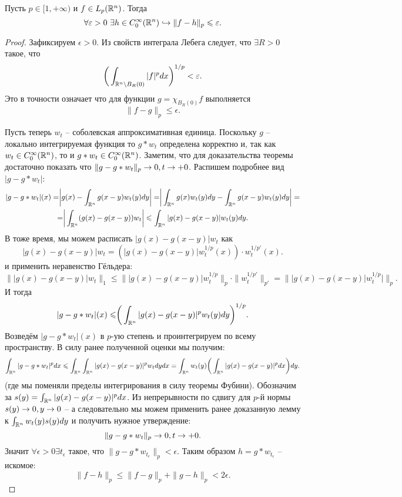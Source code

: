 \begin{theorem}
    Пусть $p \in [1, +\infty)$ и $f \in L_p(\mathbb{R}^n)$. Тогда
    \[
        \forall \varepsilon > 0  \ \exists h \in C^{\infty}_0(\mathbb{R}^n) \hookrightarrow \|f - h\|_p \leqslant \varepsilon.
    \]
\end{theorem}
\begin{proof}
    Зафиксируем $\epsilon > 0$.
    Из свойств интеграла Лебега следует, что $\exists R > 0$ такое, что
    \[
        \biggr(\int_{\mathbb{R}^n \setminus B_R(0)} |f|^p dx\biggr)^{1/p} < \varepsilon.
    \]
    Это в точности означает что для функции $g = \chi_{B_R(0)}f$ выполняется
    \[
        \|f - g\|_p \leq \epsilon.
    \]
    
    Пусть теперь $w_t$ -- соболевская аппроксимативная единица.
    Поскольку $g$ -- локально интегрируемая функция то $g * w_t$ определена корректно и, так как $w_t \in C_0^\infty(\mathbb{R}^n)$, то и $g * w_t \in C_0^\infty(\mathbb{R}^n)$.
    Заметим, что для доказательства теоремы достаточно показать что $\|g - g * w_t\|_p \rightarrow 0, t \rightarrow +0$.
    Распишем подробнее вид $|g - g * w_t|$:
    \begin{multline*}
        |g - g * w_t|(x) = \biggr| g(x) - \int_{\mathbb{R}^n} g(x - y)w_t(y)dy \biggr| = \biggr|\int_{\mathbb{R}^n} g(x)w_t(y)dy - \int_{\mathbb{R}^n} g(x - y)w_t(y)dy\biggr| = \\ = \biggr|\int_{\mathbb{R}^n} (g(x) - g(x - y))w_t\biggr| \leqslant \int_{\mathbb{R}^n} |g(x) - g(x - y)|w_t(y)dy.
    \end{multline*}
    В тоже время, мы можем расписать $|g(x) - g(x - y)|w_t$ как \[|g(x) - g(x - y)|w_t = (|g(x) - g(x - y)|w_t^{1/p}(x)) \cdot w_t^{1/p'}(x).\]
    и применить неравенство Гёльдера:
    \[
        \||g(x) - g(x - y)|w_t\|_1 \leq \||g(x) - g(x - y)|w_t^{1/p}\|_p \cdot \|w_t^{1/p'}\|_{p'} = \||g(x) - g(x - y)|w_t^{1/p}|\|_p.
    \]
    И тогда
    \[
        |g - g * w_t|(x) \leqslant \biggr( \int_{\mathbb{R}^n}|g(x) - g(x - y)|^p w_t(y)dy \biggr)^{1/p}.
    \]
    Возведём $|g - g * w_t|(x)$ в $p$-ую степень и проинтегрируем по всему пространству.
    В силу ранее полученной оценки мы получим:
    \[
        \int_{\mathbb{R}^n}|g - g * w_t|^p dx \leqslant \int_{\mathbb{R}^n} \int_{\mathbb{R}^n} |g(x) - g(x - y)|^p w_t dy dx = \int_{\mathbb{R}^n} w_t(y) \biggr(\int_{\mathbb{R}^n} |g(x) - g(x - y)|^{p} dx \biggr) dy.
    \]
    (где мы поменяли пределы интегрирования в силу теоремы Фубини).
    Обозначим за $s(y) = \int_{\mathbb{R}^n}|g(x) - g(x - y)|^p dx$.
    Из непрерывности по сдвигу для $p$-й нормы $s(y) \rightarrow 0, y \rightarrow 0$ -- а следовательно мы можем применить ранее доказанную лемму к $\int_{\mathbb{R}^n}w_t(y)s(y)dy$ и получить нужное утверждение:
    \[
        \|g - g * w_t\|_p \rightarrow 0, t \rightarrow +0.
    \]
    Значит $\forall \epsilon > 0 \exists t_{\epsilon}$ такое, что $\|g - g * w_{t_\epsilon}\|_p < \epsilon$.
    Таким образом $h = g * w_{t_\epsilon}$ -- искомое:
    \[
        \|f - h\|_p \leq \|f - g\|_p + \|g - h\|_p < 2\epsilon.
    \]
\end{proof}
